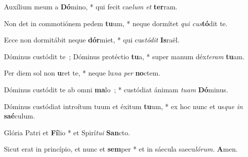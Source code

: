 \vs Auxílium meum a \textbf{Dó}mino, * qui fecit cae\textit{lum et} \textbf{ter}ram.

\vs Non det in commotiónem pedem \textbf{tu}um, * neque dormítet \textit{qui cus}\textbf{tó}dit te.

\vs Ecce non dormitábit neque \textbf{dór}miet, * qui cus\textit{tódit} \textbf{Is}raël.

\vs Dóminus custódit te~; Dóminus protéctio \textbf{tu}a, * super manum déx\textit{teram} \textbf{tu}am.

\vs Per diem sol non \textbf{u}ret te, * neque lu\textit{na per} \textbf{no}ctem.

\vs Dóminus custódit te ab omni \textbf{ma}lo~; * custódiat ánimam \textit{tuam} \textbf{Dó}minus.

\vs Dóminus custódiat introítum tuum et éxitum \textbf{tu}um, * ex hoc nunc et us\textit{que in} \textbf{saé}culum.

\vs Glória Patri et \textbf{Fí}lio * et Spirí\textit{tui} \textbf{San}cto.

\vs Sicut erat in princípio, et nunc et \textbf{sem}per * et in sáecula saecu\textit{lórum.} \textbf{A}men.

